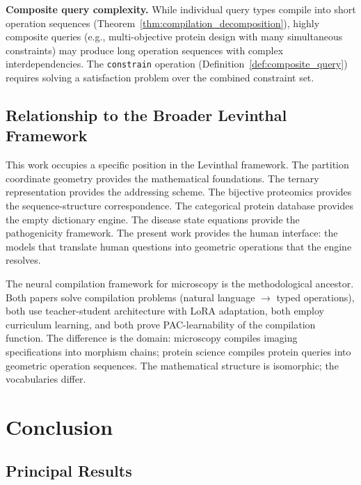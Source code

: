 \documentclass[11pt,twocolumn,a4paper]{article}
\theoremstyle{definition}
\theoremstyle{remark}
\begin{document}
\textbf{Composite query complexity.} While individual query types compile into short operation sequences (Theorem~\ref{thm:compilation_decomposition}), highly composite queries (e.g., multi-objective protein design with many simultaneous constraints) may produce long operation sequences with complex interdependencies. The \texttt{constrain} operation (Definition~\ref{def:composite_query}) requires solving a satisfaction problem over the combined constraint set.

\subsection{Relationship to the Broader Levinthal Framework}

This work occupies a specific position in the Levinthal framework. The partition coordinate geometry \citep{sachikonye2025a} provides the mathematical foundations. The ternary representation \citep{sachikonye2025d} provides the addressing scheme. The bijective proteomics \citep{sachikonye2025f} provides the sequence-structure correspondence. The categorical protein database \citep{sachikonye2025c} provides the empty dictionary engine. The disease state equations \citep{sachikonye2025e} provide the pathogenicity framework. The present work provides the human interface: the models that translate human questions into geometric operations that the engine resolves.

The neural compilation framework for microscopy \citep{sachikonye2025b} is the methodological ancestor. Both papers solve compilation problems (natural language $\to$ typed operations), both use teacher-student architecture with LoRA adaptation, both employ curriculum learning, and both prove PAC-learnability of the compilation function. The difference is the domain: microscopy compiles imaging specifications into morphism chains; protein science compiles protein queries into geometric operation sequences. The mathematical structure is isomorphic; the vocabularies differ.

\section{Conclusion}
\label{sec:conclusion}

\subsection{Principal Results}
\end{document}
